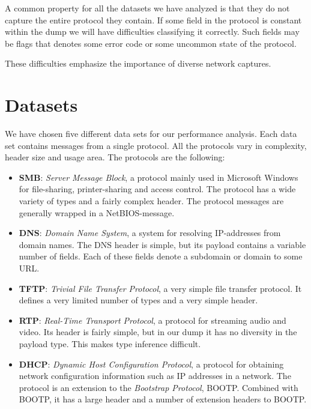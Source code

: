 \documentclass[a4paper]{report}
\begin{document}
A common property for all the datasets we have analyzed is that they do
not capture the entire protocol they contain. If some field in the protocol is
constant within the dump we will have difficulties classifying it correctly.
Such fields may be flags that denotes some error code or some uncommon state of
the protocol.

These difficulties emphasize the importance of diverse network captures.

\section{Datasets}
We have chosen five different data sets for our performance analysis. Each
data set contains messages from a single protocol. All the protocols vary
in complexity, header size and usage area. The protocols are the following:

\begin{itemize}
    \item \textbf{SMB}: \emph{Server Message Block}, a protocol mainly used
        in Microsoft Windows for file-sharing, printer-sharing and access
        control. The protocol has a wide variety of types and a fairly complex
        header. The protocol messages are generally wrapped in a
        NetBIOS-message.
    \item \textbf{DNS}: \emph{Domain Name System}, a system for resolving
        IP-addresses from domain names. The DNS header is simple, but its
        payload contains a variable number of fields. Each of these fields
        denote a subdomain or domain to some URL.
    \item \textbf{TFTP}: \emph{Trivial File Transfer Protocol}, a very simple
        file transfer protocol. It defines a very limited number of types
        and a very simple header.
    \item \textbf{RTP}: \emph{Real-Time Transport Protocol}, a protocol for
        streaming audio and video. Its header is fairly simple, but in our
        dump it has no diversity in the payload type. This makes type
        inference difficult.
    \item \textbf{DHCP}: \emph{Dynamic Host Configuration Protocol}, a
        protocol for obtaining network configuration information such as
        IP addresses in a network. The protocol is an extension to the
        \emph{Bootstrap Protocol}, BOOTP. Combined with BOOTP, it has a large
        header and a number of extension headers to BOOTP.
\end{itemize}
\end{document}
